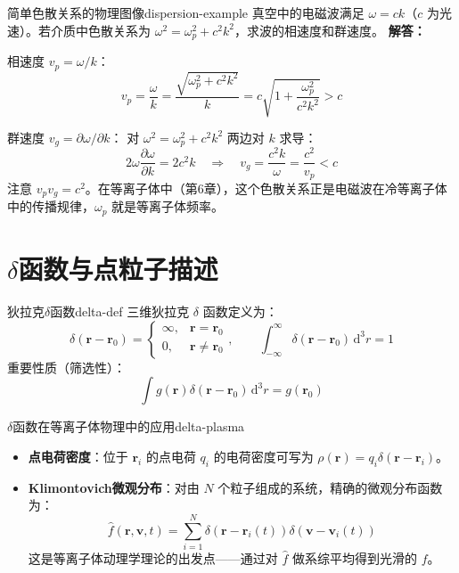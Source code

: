 \documentclass[12pt,a4paper,openany,oneside]{book}
\newcommand{\diff}{\mathrm{d}}
\newcommand{\vect}[1]{\bm{#1}}
\newcommand{\difficulty}[1]{\marginnote{\textcolor{red}{\textbf{[#1]}}}}
\begin{document}
\begin{example}{简单色散关系的物理图像}{dispersion-example}
\difficulty{基础}
真空中的电磁波满足 $\omega = ck$（$c$ 为光速）。若介质中色散关系为 $\omega^2 = \omega_p^2 + c^2k^2$，求波的相速度和群速度。
\tcblower
\textbf{解答：}

相速度 $v_p = \omega/k$：
\[
v_p = \frac{\omega}{k} = \frac{\sqrt{\omega_p^2 + c^2k^2}}{k} = c\sqrt{1 + \frac{\omega_p^2}{c^2k^2}} > c
\]

群速度 $v_g = \partial\omega/\partial k$：
对 $\omega^2 = \omega_p^2 + c^2k^2$ 两边对 $k$ 求导：
\[
2\omega\frac{\partial\omega}{\partial k} = 2c^2 k \quad\Rightarrow\quad v_g = \frac{c^2 k}{\omega} = \frac{c^2}{v_p} < c
\]
注意 $v_p v_g = c^2$。在等离子体中（第6章），这个色散关系正是电磁波在冷等离子体中的传播规律，$\omega_p$ 就是等离子体频率。
\end{example}

\section{$\delta$函数与点粒子描述}\difficulty{基础}

\begin{definition}{狄拉克$\delta$函数}{delta-def}
三维狄拉克 $\delta$ 函数定义为：
\[
\delta(\vect{r} - \vect{r}_0) = \begin{cases} \infty, & \vect{r} = \vect{r}_0 \\ 0, & \vect{r} \neq \vect{r}_0 \end{cases}, \qquad \int_{-\infty}^{\infty} \delta(\vect{r}-\vect{r}_0)\,\diff^3r = 1
\]
重要性质（筛选性）：
\[
\int g(\vect{r}) \delta(\vect{r} - \vect{r}_0)\,\diff^3r = g(\vect{r}_0)
\]
\end{definition}

\begin{insight}{$\delta$函数在等离子体物理中的应用}{delta-plasma}
\begin{itemize}
\item \textbf{点电荷密度}：位于 $\vect{r}_i$ 的点电荷 $q_i$ 的电荷密度可写为 $\rho(\vect{r}) = q_i\delta(\vect{r}-\vect{r}_i)$。
\item \textbf{Klimontovich微观分布}：对由 $N$ 个粒子组成的系统，精确的微观分布函数为：
\[
\hat{f}(\vect{r},\vect{v},t) = \sum_{i=1}^{N} \delta(\vect{r} - \vect{r}_i(t)) \delta(\vect{v} - \vect{v}_i(t))
\]
这是等离子体动理学理论的出发点——通过对 $\hat{f}$ 做系综平均得到光滑的 $f$。
\end{itemize}
\end{insight}
\end{document}
